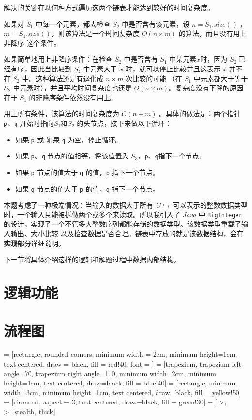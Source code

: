 解决的关键在以何种方式遍历这两个链表才能达到较好的时间复杂度。

如果对 $S_1$ 中每一个元素，都去检查 $S_2$ 中是否含有该元素，设 $n = S_1.size()$ ，%
$m = S_1.size()$，则该算法是一个时间复杂度 $O(n \times m)$ 的算法，而且没有用上 {\kaishu 非降序} 这个条件。

如果简单地用上{\kaishu 非降序}条件：在检查 $S_2$ 中是否含有 $S_1$ 中某元素$x$时，因为 $S_2$ 已经有序，因此当比较到%
$S_2$ 中元素大于 $x$ 时，就可以停止比较并且这表示 $x$ 并不在 $S_2$ 中。这种算法还是有退化成 $n \times m$ 次比较的可能%
（在 $S_1$ 中元素都大于等于 $S_2$ 中元素时），并且平均时间复杂度也还是 $O(n \times m)$。复杂度没有下降的原因在于 $S_1$ %
的非降序条件依然没有用上。

用上所有条件，该算法的时间复杂度为 $O(n + m)$ 。具体的做法是：两个指针 \lstinline{p}、\lstinline{q} 开始时指向$S_1$和$S_2$%
的头节点，接下来做以下循环：\label{logic}
\begin{itemize}
    \item 如果 \lstinline{p} 或 如果 \lstinline{q} 为空，停止循环。
    \item 如果 \lstinline{p}、\lstinline{q} 节点的值相等，将该值置入 $S_3$，\lstinline{p}、\lstinline{q}指下一个节点;
    \item 如果 \lstinline{p} 节点的值大于 \lstinline{q} 的值，\lstinline{p} 指下一个节点。
    \item 如果 \lstinline{q} 节点的值大于 \lstinline{p} 的值，\lstinline{q} 指下一个节点。
\end{itemize}

本题考虑了一种极端情况：当输入的数据大于所有 \emph{C++} 可以表示的整数数据类型时，一个输入只能被拆做两个或多个来读取。所以我引入了%
\emph{Java} 中 \lstinline{BigInteger} 的设计，实现了一个不管多大整数序列都能存储的数据类型。该数据类型重载了输入输出、大小比较%
以及检查数据是否合理。链表中存放的就是该数据结构，会在\textbf{实现}部分详细说明。

下一节将具体介绍这样的逻辑和解题过程中数据内部结构。

\section{逻辑功能}

\section{流程图}

 = [rectangle, rounded corners, minimum width = 2cm, 
        minimum height=1cm, text centered, draw = black, fill = red!40,
        font = {\bfseries}]
     = [trapezium, trapezium left angle=70, trapezium right angle=110, 
    minimum width=2cm, minimum height=1cm, text centered, draw=black, fill = blue!40]
     = [rectangle, minimum width=3cm, minimum height=1cm, text centered, draw=black, fill = yellow!50]
     = [diamond, aspect = 3, text centered, draw=black, fill = green!30]
     = [->, >=stealth, thick]

